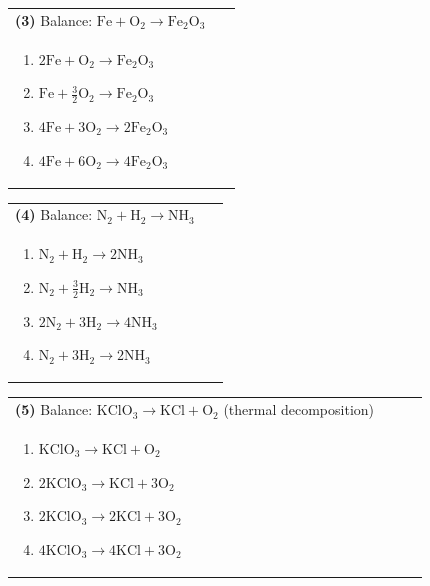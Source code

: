 \documentclass{article}
\begin{document}
{\vspace{0.2cm}
\noindent \begin{tabular}{|p{0.9\linewidth}|}
\hline
\vspace{0.2cm}
\textbf{(3)} Balance: \(\mathrm{Fe + O_2 \rightarrow Fe_2O_3}\)\\
\begin{minipage}[t]{0.85\linewidth}
\begin{enumerate}[label=\alph*.]
   \item \(\mathrm{2Fe + O_2 \rightarrow Fe_2O_3}\)
   \item \(\mathrm{Fe + \tfrac{3}{2}O_2 \rightarrow Fe_2O_3}\)
   \item \(\mathrm{4Fe + 3O_2 \rightarrow 2Fe_2O_3}\)
   \item \(\mathrm{4Fe + 6O_2 \rightarrow 4Fe_2O_3}\)
\end{enumerate}
\end{minipage}\\
\hline
\end{tabular}

\vspace{0.2cm}
\noindent \begin{tabular}{|p{0.9\linewidth}|}
\hline
\vspace{0.2cm}
\textbf{(4)} Balance: \(\mathrm{N_2 + H_2 \rightarrow NH_3}\)\\
\begin{minipage}[t]{0.85\linewidth}
\begin{enumerate}[label=\alph*.]
   \item \(\mathrm{N_2 + H_2 \rightarrow 2NH_3}\)
   \item \(\mathrm{N_2 + \tfrac{3}{2}H_2 \rightarrow NH_3}\)
   \item \(\mathrm{2N_2 + 3H_2 \rightarrow 4NH_3}\)
   \item \(\mathrm{N_2 + 3H_2 \rightarrow 2NH_3}\)
\end{enumerate}
\end{minipage}\\
\hline
\end{tabular}
\newpage

\vspace{0.2cm}
\noindent \begin{tabular}{|p{0.9\linewidth}|}
\hline
\vspace{0.2cm}
\textbf{(5)} Balance: \(\mathrm{KClO_3 \rightarrow KCl + O_2}\) (thermal decomposition)\\
\begin{minipage}[t]{0.85\linewidth}
\begin{enumerate}[label=\alph*.]
   \item \(\mathrm{KClO_3 \rightarrow KCl + O_2}\)
   \item \(\mathrm{2KClO_3 \rightarrow KCl + 3O_2}\)
   \item \(\mathrm{2KClO_3 \rightarrow 2KCl + 3O_2}\)
   \item \(\mathrm{4KClO_3 \rightarrow 4KCl + 3O_2}\)
\end{enumerate}
\end{minipage}\\
\hline
\end{tabular}

}
\end{document}

